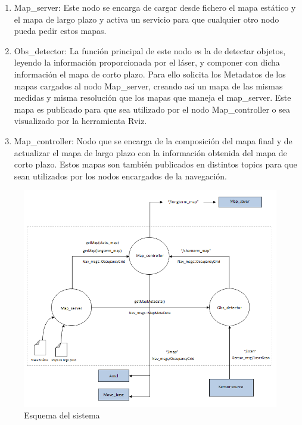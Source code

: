 \begin{enumerate}
\item Map\_server: Este nodo se encarga de cargar desde fichero el mapa estático y el mapa de largo plazo y activa un servicio para que cualquier otro nodo pueda pedir estos mapas. 
\item Obs\_detector: La función principal de este nodo es la de detectar objetos, leyendo la información proporcionada por el láser, y componer con dicha información el mapa de corto plazo. Para ello solicita los Metadatos de los mapas cargados al nodo Map\_server, creando así un mapa de las mismas medidas y misma resolución que los mapas que maneja el map\_server. Este mapa es publicado para que sea utilizado por el nodo Map\_controller o sea visualizado por la herramienta Rviz.
\item Map\_controller: Nodo que se encarga de la composición del mapa final y de actualizar el mapa de largo plazo con la información obtenida del mapa de corto plazo. Estos mapas son también publicados en distintos topics para que sean utilizados por los nodos encargados de la navegación.
\end{enumerate}
\begin{figure} [H]
  \begin{center}
    \includegraphics[width=16cm]{img/cap5/esquemaSistema}
  \end{center}
  \caption{Esquema del sistema}
  \label{fig:esquemaSistema}
\end{figure}

